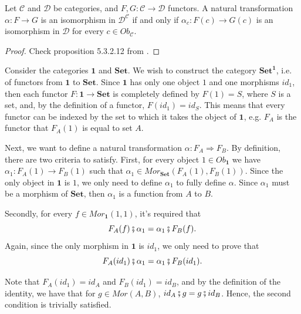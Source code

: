 \begin{theorem}
	Let $\mathcal C$ and $\mathcal D$ be categories, and $F,G:\mathcal C \to \mathcal D$ functors.
	A natural transformation $\alpha : F \to G$ is an isomorphism in $\mathcal D^\mathcal C$
	if and only if $\alpha_c: F(c) \to G(c)$ is an isomorphism in $\mathcal D$ for every
	$c \in Ob_\mathcal C$.
\end{theorem}
\begin{proof}
	Check proposition 5.3.2.12 from \citet{spivak2014category}.
\end{proof}


\begin{example}
	Consider the categories $\bm 1$ and $\mathbf{Set}$. We wish to
	construct the category $\mathbf{Set}^{\bm 1}$, i.e. of functors from $\bm 1$
	to $\mathbf{Set}$. Since $\bm 1$ has only one object $1$ and one morphisms $id_1$, then each functor
	$F:\bm 1 \to \mathbf{Set}$ is completely defined by $F(1) = S$, where $S$ is a set, and,
	by the definition of a functor, $F(id_1) = id_S$. This means that every functor
	can be indexed by the set to which it takes the object of $\bm 1$, e.g. $F_A$ is the
	functor that $F_A(1)$ is equal to set $A$.

	Next, we want to define a natural transformation $\alpha: F_A \Rightarrow F_B$.
	By definition, there are two criteria to satisfy. First,
	for every object $1 \in Ob_{\bm 1}$ we have
	$\alpha_1:F_A(1) \to F_B(1)$ such that $\alpha_1 \in Mor_{\mathbf{Set}}(F_A(1),F_B(1))$.
	Since the only object in $\bm 1$ is $1$, we only need to define $\alpha_1$ to fully define $\alpha$.
	Since $\alpha_1$ must be a morphism of $\mathbf{Set}$, then $\alpha_1$ is a function
	from $A$ to $B$.

	Secondly, for every $f \in Mor_{\bm 1} (1,1)$, it's required that
	\begin{displaymath}
		F_A(f) \fatsemi \alpha_1 = \alpha_1 \fatsemi F_B(f).
	\end{displaymath}
	Again, since the only morphism in $\bm 1$ is $id_1$, we only need to prove that
	\begin{displaymath}
		F_A(id_1) \fatsemi \alpha_1 = \alpha_1 \fatsemi F_B(id_1).
	\end{displaymath}

	Note that $F_A(id_1) = id_A$ and $F_B(id_1) = id_B$, and by the definition
	of the identity, we have that for $g \in Mor(A,B)$, $id_A \fatsemi g = g \fatsemi id_B$.
	Hence, the second condition is trivially satisfied.


\end{example}
